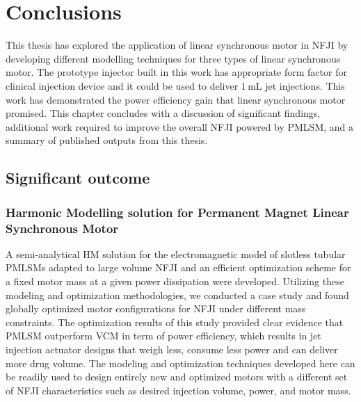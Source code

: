 \chapter{Conclusions}                   \label{Chapter:conclusions}


    This thesis has explored the application of linear synchronous motor in \acf{NFJI} by developing different modelling techniques for three types of linear synchronous motor. The prototype injector built in this work has appropriate form factor for clinical injection device and it could be used to deliver $1\,\mathrm{mL}$ jet injections. This work has demonstrated the power efficiency gain that linear synchronous motor promised. This chapter concludes with a discussion of significant findings, additional work required to improve the overall \acs{NFJI} powered by \acf{PMLSM}, and a summary of published outputs from this thesis.
    

\section{Significant outcome}           \label{Chapter:experiment/significant outcome}
        
        
    \subsection{Harmonic Modelling solution for Permanent Magnet Linear Synchronous Motor}   
        
        A semi-analytical \acf{HM} solution for the electromagnetic model of slotless tubular \acsp{PMLSM} adapted to large volume \acs{NFJI} and an efficient optimization scheme for a fixed motor mass at a given power dissipation were developed. Utilizing these modeling and optimization methodologies,  we conducted a case study and found globally optimized motor configurations for \acs{NFJI} under different mass constraints. The optimization results of this study provided clear evidence that \acs{PMLSM} outperform \acf{VCM} in term of power efficiency, which results in jet injection actuator designs that weigh less, consume less power and can deliver more drug volume. The modeling and optimization techniques developed here can be readily used to design entirely new and optimized motors with a different set of \acs{NFJI} characteristics such as desired injection volume, power, and motor mass.
        
